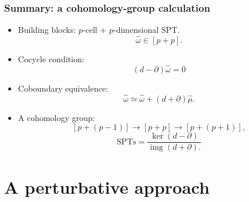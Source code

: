 \documentclass[xcolor=table, 10pt, aspectratio=43]{beamer}
\DeclareMathOperator{\img}{img}
\begin{document}
\begin{frame}
\frametitle{Summary: a cohomology-group calculation}
\begin{itemize}
\item Building blocks: $p$-cell + $p$-dimensional SPT. 
\[\hat\omega\in[p+p].\]
\item Cocycle condition:
\[(d-\partial)\hat\omega=0\]
\item Coboundary equivalence:
\[\hat\omega\simeq\hat\omega+(d+\partial)\hat\mu.\]
\item A cohomology group:
\[[p+(p-1)]\rightarrow[p+p]\rightarrow[p+(p+1)],\]
\[\text{SPTs}=\frac{\ker(d-\partial)}{\img(d+\partial).}\]
\end{itemize}
\end{frame}

\section{A perturbative approach}
\end{document}
